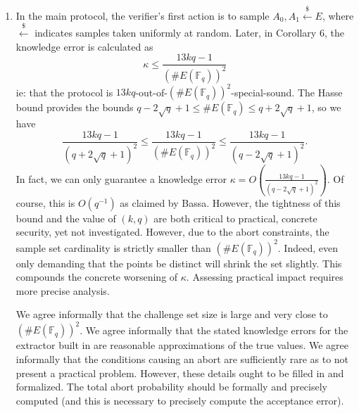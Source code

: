 \documentclass{article}
\theoremstyle{definition}
\newcommand{\Fq}{\mathbb{F}_q}
\newcommand{\6}{\mathbf}
\newcommand{\7}{\mathcal}
\newcommand{\lsamp}{\xleftarrow{\$}}
\begin{document}
\begin{enumerate}

    
    \item In the main protocol, the verifier's first action is to sample $A_0, A_1 \lsamp E$, where $\lsamp$ indicates samples taken uniformly at random. Later, in Corollary 6, the knowledge error is calculated as
    $$\kappa \leq \frac{13kq-1}{(\#E(\Fq))^2}$$
    ie: that the protocol is $13kq$-out-of-$(\#E(\Fq))^2$-special-sound. The Hasse bound provides the bounds $q  - 2\sqrt{q} + 1 \leq \#E(\Fq) \leq q + 2\sqrt{q} + 1$, so we have \[\frac{13kq-1}{(q+2\sqrt{q}+1)^2} \leq \frac{13kq-1}{(\#E(\Fq))^2} \leq \frac{13kq-1}{(q-2\sqrt{q}+1)^2}.\] In fact, we can only guarantee a knowledge error $\kappa = O(\frac{13kq-1}{(q-2\sqrt{q}+1)^2})$. Of course, this is $O(q^{-1})$ as claimed by Bassa. However, the tightness of this bound and the value of $(k,q)$ are both critical to practical, concrete security, yet not investigated. 
    However, due to the abort constraints, the sample set cardinality is strictly smaller than $(\#E(\Fq))^2$. Indeed, even only demanding that the points be distinct will shrink the set slightly. This compounds the concrete worsening of $\kappa$. Assessing practical impact requires more precise analysis.
    \smallskip 
    
    We agree informally that the challenge set size is large and very close to $(\#E(\Fq))^2$. We agree informally that the stated knowledge errors for the extractor built in \cite{BassaSoundnessIPDL} are reasonable approximations of the true values. We agree informally that the conditions causing an abort are sufficiently rare as to not present a practical problem. However, these details ought to be filled in and formalized. The total abort probability should be formally and precisely computed (and this is necessary to precisely compute the acceptance error).
    



\end{enumerate}
\end{document}
